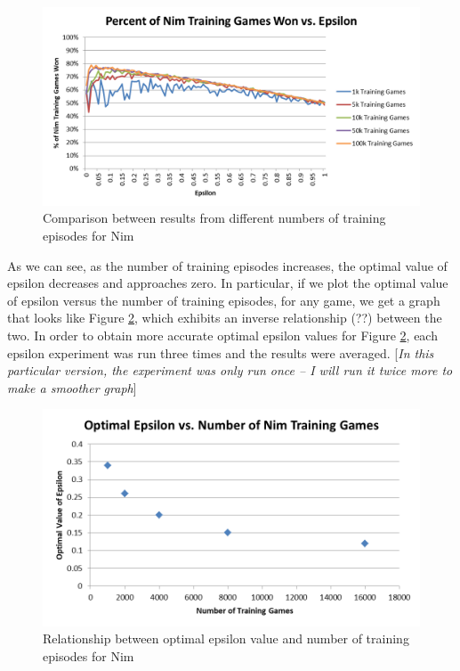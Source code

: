 \documentclass[11pt,a4paper]{report}
\begin{document}
\begin{figure}[htbp]
	\begin{center}
		\includegraphics[width=125mm]{Nim_EpsilonResults_Wins_Comparison.png}
		\caption{Comparison between results from different numbers of training episodes for Nim}
		\label{nim-epsilon-win-comparison}
	\end{center}
\end{figure}

As we can see, as the number of training episodes increases, the optimal value of epsilon decreases and approaches zero. In particular, if we plot the optimal value of epsilon versus the number of training episodes, for any game, we get a graph that looks like Figure \ref{nim-training-vs-opt-epsilon}, which exhibits an inverse relationship (??) between the two. In order to obtain more accurate optimal epsilon values for Figure \ref{nim-training-vs-opt-epsilon}, each epsilon experiment was run three times and the results were averaged. [\emph{In this particular version, the experiment was only run once -- I will run it twice more to make a smoother graph}]%

\begin{figure}[htbp]
	\begin{center}
		\includegraphics[width=125mm]{Nim_OptimalEpsilon_vs_Training.png}
		\caption{Relationship between optimal epsilon value and number of training episodes for Nim}
		\label{nim-training-vs-opt-epsilon}
	\end{center}
\end{figure}
\end{document}
